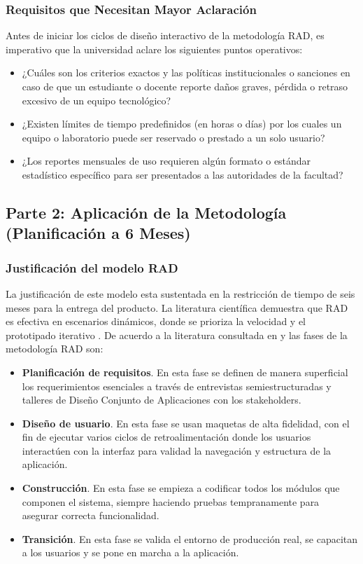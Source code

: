 \documentclass[pdflatex,sn-mathphys-num]{sn-jnl}%
\theoremstyle{thmstyleone}%
\theoremstyle{thmstyletwo}%
\theoremstyle{thmstylethree}%
\begin{document}
 \subsubsection{Requisitos que Necesitan Mayor Aclaración}
 Antes de iniciar los ciclos de diseño interactivo de la metodología RAD, es imperativo que la universidad  aclare los siguientes puntos operativos:
 \begin{itemize}
 	\item ¿Cuáles son los criterios exactos y las políticas institucionales o sanciones en caso de que un estudiante o docente reporte daños graves, pérdida o retraso excesivo de un equipo tecnológico?
 	\item ¿Existen límites de tiempo predefinidos (en horas o días) por los cuales un equipo o laboratorio puede ser reservado o prestado a un solo usuario?
 	\item ¿Los reportes mensuales de uso requieren algún formato o estándar estadístico específico para ser presentados a las autoridades de la facultad?
 \end{itemize}
 
 \subsection{Parte 2: Aplicación de la Metodología (Planificación a 6 Meses)}
\subsubsection{Justificación del modelo RAD}
La justificación de este modelo esta sustentada en la restricción de tiempo de seis meses para la entrega del producto. La literatura científica demuestra que RAD es efectiva en escenarios dinámicos, donde se prioriza la velocidad y el prototipado iterativo \cite{purnamasari_rapid_2026}. 
De acuerdo a la literatura consultada en \cite{purnamasari_rapid_2026} y \cite{alvarez-pineda_implementacion_2026} las fases de la metodología RAD son:
\begin{itemize}
	\item \textbf{Planificación de requisitos}. En esta fase se definen de manera superficial los requerimientos esenciales  a través de entrevistas semiestructuradas y talleres de Diseño Conjunto de Aplicaciones con los stakeholders.
	\item \textbf{Diseño de usuario}. En esta fase se usan maquetas de alta fidelidad, con el fin de ejecutar varios ciclos de retroalimentación donde los usuarios interactúen con la interfaz para validad la navegación y estructura de la aplicación.
	\item \textbf{Construcción}. En esta fase se empieza a codificar todos los módulos que componen el sistema, siempre haciendo pruebas tempranamente para asegurar correcta funcionalidad.
	\item \textbf{Transición}. En esta fase se valida el entorno de producción real, se capacitan a los usuarios y se pone en marcha a la aplicación.
\end{itemize}
\end{document}

